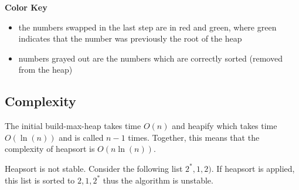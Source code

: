 \textbf{Color Key}

\begin{itemize}
    \item the numbers swapped in the last step are in {\color{red}red} and {\color{green}green}, where {\color{green}green} indicates that the number was previously the root of the heap
    \item numbers {\color{gray}grayed} out are the numbers which are correctly sorted (removed from the heap)
\end{itemize}
\subsection{Complexity}

The initial build-max-heap takes time \(O(n)\) and heapify which takes time \(O(\ln(n))\) and is called \(n - 1\) times. Together, this means that the complexity of heapsort is \(O(n \ln(n))\).\cite[p.~136]{bib:introductiontoalgorithms}

Heapsort is not stable. Consider the following list \(2^{*}, 1, 2
)\). If heapsort is applied, this list is sorted to \(2, 1, 2^{*}\) thus the algorithm is unstable.

